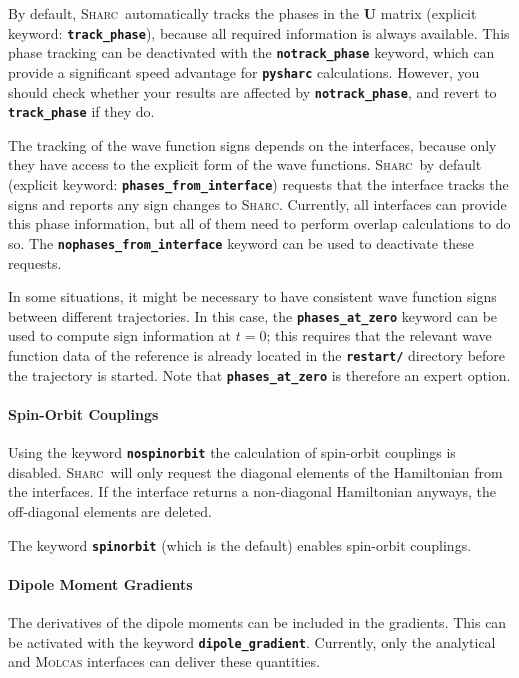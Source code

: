 \documentclass[a4paper,10pt,DIV=15,openany]{scrbook}
\newcommand{\sharc}{\textsc{Sharc}}
\newcommand{\ttt}[1]{\textbf{\texttt{#1}}}
\newcommand{\VEC}[1]{\ensuremath{\mathbf{#1}}}
\begin{document}
By default, \sharc\ automatically tracks the phases in the $\VEC{U}$ matrix (explicit keyword: \ttt{track\_phase}), because all required information is always available. This phase tracking can be deactivated with the \ttt{notrack\_phase} keyword, which can provide a significant speed advantage for \ttt{pysharc} calculations. However, you should check whether your results are affected by \ttt{notrack\_phase}, and revert to \ttt{track\_phase} if they do.

The tracking of the wave function signs depends on the interfaces, because only they have access to the explicit form of the wave functions. \sharc\ by default (explicit keyword: \ttt{phases\_from\_interface}) requests that the interface tracks the signs and reports any sign changes to \sharc. Currently, all interfaces can provide this phase information, but all of them need to perform overlap calculations to do so. The \ttt{nophases\_from\_interface} keyword can be used to deactivate these requests.

In some situations, it might be necessary to have consistent wave function signs between different trajectories. In this case, the \ttt{phases\_at\_zero} keyword can be used to compute sign information at $t=0$; this requires that the relevant wave function data of the reference is already located in the \ttt{restart/} directory before the trajectory is started. Note that \ttt{phases\_at\_zero} is therefore an expert option.

\paragraph{Spin-Orbit Couplings}

Using the keyword \ttt{nospinorbit} the calculation of spin-orbit couplings is disabled. \sharc\ will only request the diagonal elements of the Hamiltonian from the interfaces. If the interface returns a non-diagonal Hamiltonian anyways, the off-diagonal elements are deleted.

The keyword \ttt{spinorbit} (which is the default) enables spin-orbit couplings.

\paragraph{Dipole Moment Gradients}

The derivatives of the dipole moments can be included in the gradients. This can be activated with the keyword \ttt{dipole\_gradient}. Currently, only the analytical and \textsc{Molcas} interfaces can deliver these quantities.
\end{document}
